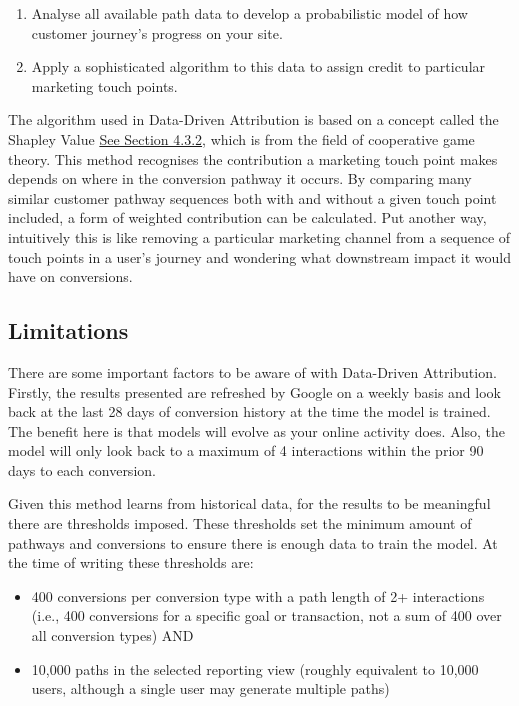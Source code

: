 \documentclass[]{book}
\providecommand{\tightlist}{%
  \setlength{\itemsep}{0pt}\setlength{\parskip}{0pt}}
\begin{document}
\begin{enumerate}
\def\labelenumi{\arabic{enumi}.}
\item
  Analyse all available path data to develop a probabilistic model of how
  customer journey's progress on your site.
\item
  Apply a sophisticated algorithm to this data to assign credit to particular
  marketing touch points.
\end{enumerate}

The algorithm used in Data-Driven Attribution is based on a concept called the
Shapley Value \protect\hyperlink{shapley-value}{See Section 4.3.2}, which is from the field of cooperative game theory. This method
recognises the contribution a marketing touch point makes depends on where in
the conversion pathway it occurs. By comparing many similar customer pathway
sequences both with and without a given touch point included, a form of weighted
contribution can be calculated. Put another way, intuitively this is like
removing a particular marketing channel from a sequence of touch points in
a user's journey and wondering what downstream impact it would have on
conversions.

\hypertarget{limitations}{%
\subsection{Limitations}\label{limitations}}

There are some important factors to be aware of with Data-Driven Attribution.
Firstly, the results presented are refreshed by Google on a weekly basis and
look back at the last 28 days of conversion history at the time the model is
trained. The benefit here is that models will evolve as your online activity
does. Also, the model will only look back to a maximum of 4 interactions
within the prior 90 days to each conversion.

Given this method learns from historical data, for the results to be meaningful
there are thresholds imposed. These thresholds set the minimum amount of
pathways and conversions to ensure there is enough data to train the model.
At the time of writing these thresholds are:

\begin{itemize}
\tightlist
\item
  400 conversions per conversion type with a path length of 2+ interactions
  (i.e., 400 conversions for a specific goal or transaction, not a sum of 400
  over all conversion types) AND\\
\item
  10,000 paths in the selected reporting view (roughly equivalent to 10,000
  users, although a single user may generate multiple paths)
\end{itemize}
\end{document}
